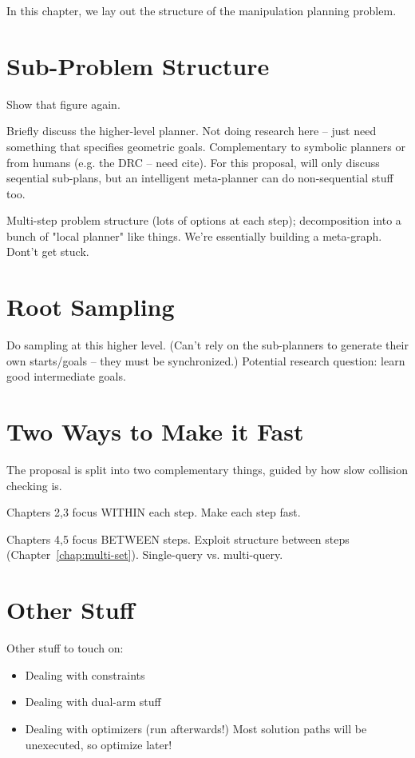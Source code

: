 \documentclass{report}
\begin{document}
In this chapter,
we lay out the structure of the manipulation planning problem.

\section{Sub-Problem Structure}

Show that figure again.

Briefly discuss the higher-level planner.
Not doing research here -- just need something that specifies
geometric goals.
Complementary to symbolic planners
or from humans (e.g. the DRC -- need cite).
For this proposal,
will only discuss seqential sub-plans,
but an intelligent meta-planner
can do non-sequential stuff too.

Multi-step problem structure (lots of options at each step);
decomposition into a bunch of "local planner" like things.
We're essentially building a meta-graph.
Dont't get stuck.

\section{Root Sampling}

Do sampling at this higher level.
(Can't rely on the sub-planners to generate their own starts/goals --
they must be synchronized.)
Potential research question: learn good intermediate goals.

\section{Two Ways to Make it Fast}

The proposal is split into two complementary things,
guided by how slow collision checking is.

Chapters 2,3 focus WITHIN each step.
Make each step fast.

Chapters 4,5 focus BETWEEN steps.
Exploit structure between steps (Chapter~\ref{chap:multi-set}).
Single-query vs. multi-query.

\section{Other Stuff}

Other stuff to touch on:
\begin{itemize}
\item Dealing with constraints
\item Dealing with dual-arm stuff
\item Dealing with optimizers (run afterwards!)
   Most solution paths will be unexecuted, so optimize later!
\end{itemize}
\end{document}
